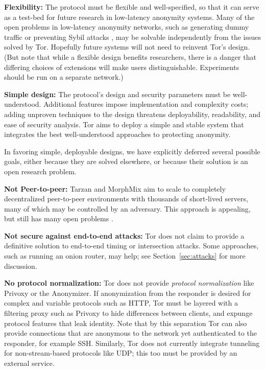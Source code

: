 \documentclass[times,10pt,twocolumn]{article}
\begin{document}
\textbf{Flexibility:} The protocol must be flexible and well-specified,
so that it can serve as a test-bed for future research in low-latency
anonymity systems.  Many of the open problems in low-latency anonymity
networks, such as generating dummy traffic or preventing Sybil attacks
\cite{sybil}, may be solvable independently from the issues solved by
Tor. Hopefully future systems will not need to reinvent Tor's design.
(But note that while a flexible design benefits researchers,
there is a danger that differing choices of extensions will make users
distinguishable. Experiments should be run on a separate network.)

\textbf{Simple design:} The protocol's design and security
parameters must be well-understood. Additional features impose implementation
and complexity costs; adding unproven techniques to the design threatens
deployability, readability, and ease of security analysis. Tor aims to
deploy a simple and stable system that integrates the best well-understood
approaches to protecting anonymity.

\label{subsec:non-goals}
In favoring simple, deployable designs, we have explicitly deferred
several possible goals, either because they are solved elsewhere, or because
their solution is an open research problem.

\textbf{Not Peer-to-peer:} Tarzan and MorphMix aim to scale to completely
decentralized peer-to-peer environments with thousands of short-lived
servers, many of which may be controlled by an adversary.  This approach
is appealing, but still has many open problems
\cite{tarzan:ccs02,morphmix:fc04}.

\textbf{Not secure against end-to-end attacks:} Tor does not claim
to provide a definitive solution to end-to-end timing or intersection
attacks. Some approaches, such as running an onion router, may help;
see Section~\ref{sec:attacks} for more discussion.

\textbf{No protocol normalization:} Tor does not provide \emph{protocol
normalization} like Privoxy or the Anonymizer. If anonymization from
the responder is desired for complex and variable
protocols such as HTTP, Tor must be layered with a filtering proxy such
as Privoxy to hide differences between clients, and expunge protocol
features that leak identity. 
Note that by this separation Tor can also provide connections that
are anonymous to the network yet authenticated to the responder, for
example SSH.
Similarly, Tor does not currently integrate
tunneling for non-stream-based protocols like UDP; this too must be
provided by an external service.
\end{document}
